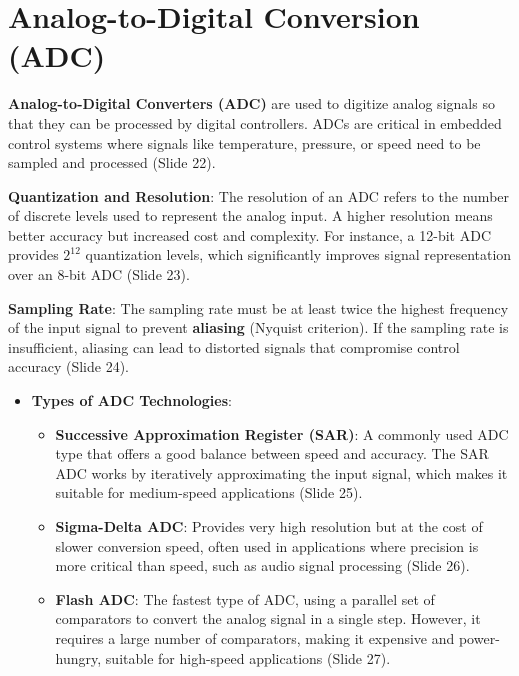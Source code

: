 \documentclass[
  14pt,
  a4paper,
  numbers=noendperiod,
  headinclude=true,
  footinclude=true,
  DIV=calc]{scrreprt}
\begin{document}
\section{Analog-to-Digital Conversion
(ADC)}\label{analog-to-digital-conversion-adc}

\textbf{Analog-to-Digital Converters (ADC)} are used to digitize analog
signals so that they can be processed by digital controllers. ADCs are
critical in embedded control systems where signals like temperature,
pressure, or speed need to be sampled and processed (Slide 22).

\textbf{Quantization and Resolution}: The resolution of an ADC refers to
the number of discrete levels used to represent the analog input. A
higher resolution means better accuracy but increased cost and
complexity. For instance, a 12-bit ADC provides \(2^{12}\) quantization
levels, which significantly improves signal representation over an 8-bit
ADC (Slide 23).

\textbf{Sampling Rate}: The sampling rate must be at least twice the
highest frequency of the input signal to prevent \textbf{aliasing}
(Nyquist criterion). If the sampling rate is insufficient, aliasing can
lead to distorted signals that compromise control accuracy (Slide 24).

\begin{itemize}
\item
  \textbf{Types of ADC Technologies}:

  \begin{itemize}
  \item
    \textbf{Successive Approximation Register (SAR)}: A commonly used
    ADC type that offers a good balance between speed and accuracy. The
    SAR ADC works by iteratively approximating the input signal, which
    makes it suitable for medium-speed applications (Slide 25).
  \item
    \textbf{Sigma-Delta ADC}: Provides very high resolution but at the
    cost of slower conversion speed, often used in applications where
    precision is more critical than speed, such as audio signal
    processing (Slide 26).
  \item
    \textbf{Flash ADC}: The fastest type of ADC, using a parallel set of
    comparators to convert the analog signal in a single step. However,
    it requires a large number of comparators, making it expensive and
    power-hungry, suitable for high-speed applications (Slide 27).
  \end{itemize}
\end{itemize}
\end{document}
